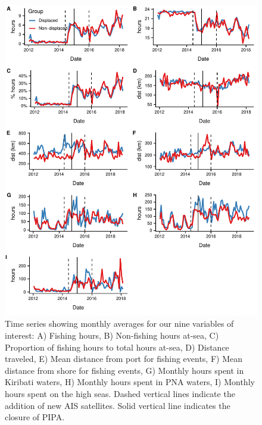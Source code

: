 \documentclass[12pt]{article}
\begin{document}
\begin{landscape}

\end{landscape}

\begin{figure}
\centering
\includegraphics{img/all_panels.pdf}
\caption{\label{fig:all_panels}Time series showing monthly averages for our nine variables of interest: A) Fishing hours, B) Non-fishing hours at-sea, C) Proportion of fishing hours to total hours at-sea, D) Distance traveled, E) Mean distance from port for fishing events, F) Mean distance from shore for fishing events, G) Monthly hours spent in Kiribati waters, H) Monthly hours spent in PNA waters, I) Monthly hours spent on the high seas. Dashed vertical lines indicate the addition of new AIS satellites. Solid vertical line indicates the closure of PIPA.}
\end{figure}
\end{document}
